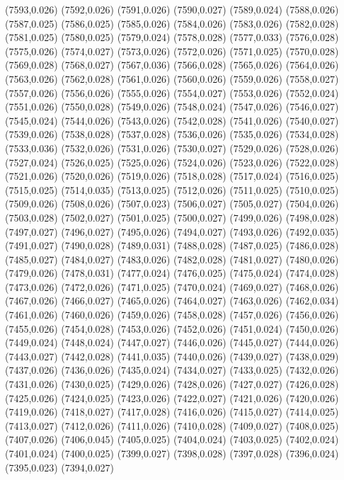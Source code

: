 (7593,0.026)
(7592,0.026)
(7591,0.026)
(7590,0.027)
(7589,0.024)
(7588,0.026)
(7587,0.025)
(7586,0.025)
(7585,0.026)
(7584,0.026)
(7583,0.026)
(7582,0.028)
(7581,0.025)
(7580,0.025)
(7579,0.024)
(7578,0.028)
(7577,0.033)
(7576,0.028)
(7575,0.026)
(7574,0.027)
(7573,0.026)
(7572,0.026)
(7571,0.025)
(7570,0.028)
(7569,0.028)
(7568,0.027)
(7567,0.036)
(7566,0.028)
(7565,0.026)
(7564,0.026)
(7563,0.026)
(7562,0.028)
(7561,0.026)
(7560,0.026)
(7559,0.026)
(7558,0.027)
(7557,0.026)
(7556,0.026)
(7555,0.026)
(7554,0.027)
(7553,0.026)
(7552,0.024)
(7551,0.026)
(7550,0.028)
(7549,0.026)
(7548,0.024)
(7547,0.026)
(7546,0.027)
(7545,0.024)
(7544,0.026)
(7543,0.026)
(7542,0.028)
(7541,0.026)
(7540,0.027)
(7539,0.026)
(7538,0.028)
(7537,0.028)
(7536,0.026)
(7535,0.026)
(7534,0.028)
(7533,0.036)
(7532,0.026)
(7531,0.026)
(7530,0.027)
(7529,0.026)
(7528,0.026)
(7527,0.024)
(7526,0.025)
(7525,0.026)
(7524,0.026)
(7523,0.026)
(7522,0.028)
(7521,0.026)
(7520,0.026)
(7519,0.026)
(7518,0.028)
(7517,0.024)
(7516,0.025)
(7515,0.025)
(7514,0.035)
(7513,0.025)
(7512,0.026)
(7511,0.025)
(7510,0.025)
(7509,0.026)
(7508,0.026)
(7507,0.023)
(7506,0.027)
(7505,0.027)
(7504,0.026)
(7503,0.028)
(7502,0.027)
(7501,0.025)
(7500,0.027)
(7499,0.026)
(7498,0.028)
(7497,0.027)
(7496,0.027)
(7495,0.026)
(7494,0.027)
(7493,0.026)
(7492,0.035)
(7491,0.027)
(7490,0.028)
(7489,0.031)
(7488,0.028)
(7487,0.025)
(7486,0.028)
(7485,0.027)
(7484,0.027)
(7483,0.026)
(7482,0.028)
(7481,0.027)
(7480,0.026)
(7479,0.026)
(7478,0.031)
(7477,0.024)
(7476,0.025)
(7475,0.024)
(7474,0.028)
(7473,0.026)
(7472,0.026)
(7471,0.025)
(7470,0.024)
(7469,0.027)
(7468,0.026)
(7467,0.026)
(7466,0.027)
(7465,0.026)
(7464,0.027)
(7463,0.026)
(7462,0.034)
(7461,0.026)
(7460,0.026)
(7459,0.026)
(7458,0.028)
(7457,0.026)
(7456,0.026)
(7455,0.026)
(7454,0.028)
(7453,0.026)
(7452,0.026)
(7451,0.024)
(7450,0.026)
(7449,0.024)
(7448,0.024)
(7447,0.027)
(7446,0.026)
(7445,0.027)
(7444,0.026)
(7443,0.027)
(7442,0.028)
(7441,0.035)
(7440,0.026)
(7439,0.027)
(7438,0.029)
(7437,0.026)
(7436,0.026)
(7435,0.024)
(7434,0.027)
(7433,0.025)
(7432,0.026)
(7431,0.026)
(7430,0.025)
(7429,0.026)
(7428,0.026)
(7427,0.027)
(7426,0.028)
(7425,0.026)
(7424,0.025)
(7423,0.026)
(7422,0.027)
(7421,0.026)
(7420,0.026)
(7419,0.026)
(7418,0.027)
(7417,0.028)
(7416,0.026)
(7415,0.027)
(7414,0.025)
(7413,0.027)
(7412,0.026)
(7411,0.026)
(7410,0.028)
(7409,0.027)
(7408,0.025)
(7407,0.026)
(7406,0.045)
(7405,0.025)
(7404,0.024)
(7403,0.025)
(7402,0.024)
(7401,0.024)
(7400,0.025)
(7399,0.027)
(7398,0.028)
(7397,0.028)
(7396,0.024)
(7395,0.023)
(7394,0.027)
